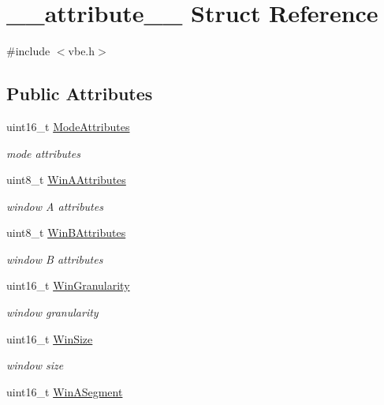 \hypertarget{struct____attribute____}{}\section{\+\_\+\+\_\+attribute\+\_\+\+\_\+ Struct Reference}
\label{struct____attribute____}


{\ttfamily \#include $<$vbe.\+h$>$}

\subsection*{Public Attributes}
\begin{DoxyCompactItemize}
\item 
uint16\+\_\+t \hyperlink{struct____attribute_____a68ea99ad36679e583fa9674016e30903}{Mode\+Attributes}
\begin{DoxyCompactList}\small\item\em mode attributes \end{DoxyCompactList}\item 
uint8\+\_\+t \hyperlink{struct____attribute_____aeffe4dec59c5a757f65a97a66c812d3b}{Win\+A\+Attributes}
\begin{DoxyCompactList}\small\item\em window A attributes \end{DoxyCompactList}\item 
uint8\+\_\+t \hyperlink{struct____attribute_____ac9e21a3d7d22b24ed82be39f790b1408}{Win\+B\+Attributes}
\begin{DoxyCompactList}\small\item\em window B attributes \end{DoxyCompactList}\item 
uint16\+\_\+t \hyperlink{struct____attribute_____acc2114dbf039909e55cc3966abd3358d}{Win\+Granularity}
\begin{DoxyCompactList}\small\item\em window granularity \end{DoxyCompactList}\item 
uint16\+\_\+t \hyperlink{struct____attribute_____ad26e754fe362f3085c7ec4c0e5e75a6f}{Win\+Size}
\begin{DoxyCompactList}\small\item\em window size \end{DoxyCompactList}\item 
uint16\+\_\+t \hyperlink{struct____attribute_____a7cde26f911e3df97b7498ee139d8de12}{Win\+A\+Segment}

\end{DoxyCompactItemize}
